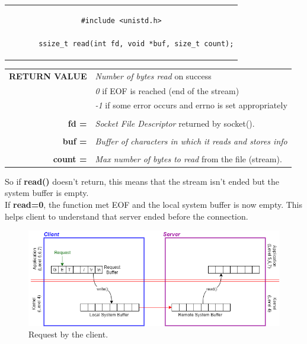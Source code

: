 \begin{center}
\begin{tabular}{c}
\begin{lstlisting}[linewidth=280pt, basicstyle=\footnotesize\sffamily,]
#include <unistd.h>

       ssize_t read(int fd, void *buf, size_t count);
\end{lstlisting}
\end{tabular}
\end{center}

\begin{table}[h]
\centering
\begin{tabular}{rcl}
\textbf{RETURN VALUE} & \multicolumn{2}{l}{\textit{Number of bytes read} on success}\\
{} & \multicolumn{2}{l}{\textit{0} if EOF is reached (end of the stream)}\\
{} & \multicolumn{2}{l}{\textit{-1} if some error occurs and errno is set appropriately}\\
& & \\
\textbf{fd =} & \multicolumn{2}{l}{\textit{Socket File Descriptor} returned by socket().}\\
& &\\
\textbf{buf =} & \multicolumn{2}{l}{\textit{Buffer of characters in which it reads and stores info}}\\
& & \\
\textbf{count =} & \multicolumn{2}{l}{\textit{Max number of bytes to read} from the file (stream).}
\end{tabular}
\end{table}
So if \textbf{read()} doesn't return, this means that the stream isn't ended but the system buffer is empty.\\
If \textbf{read=0}, the function met EOF and the local system buffer is now empty. This helps client to understand that server ended before the connection.

\begin{figure}[h]
\centering
\includegraphics[scale=0.7]{Images/read_write1}\caption{\footnotesize{Request by the client.}}\label{rw1}
\end{figure}

